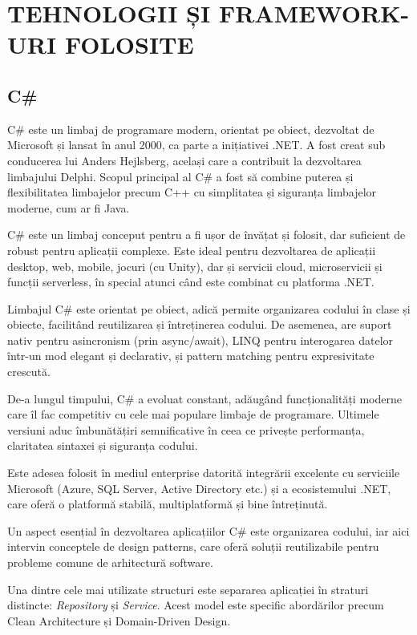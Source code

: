 \chapter{TEHNOLOGII ȘI FRAMEWORK-URI FOLOSITE}
\section{C\#}

C\# este un limbaj de programare modern, orientat pe obiect, dezvoltat de Microsoft și lansat în anul 2000, ca parte a inițiativei .NET. A fost creat sub conducerea lui Anders Hejlsberg, același care a contribuit la dezvoltarea limbajului Delphi. Scopul principal al C\# a fost să combine puterea și flexibilitatea limbajelor precum C++ cu simplitatea și siguranța limbajelor moderne, cum ar fi Java. \parencite{charp}

C\# este un limbaj conceput pentru a fi ușor de învățat și folosit, dar suficient de robust pentru aplicații complexe. Este ideal pentru dezvoltarea de aplicații desktop, web, mobile, jocuri (cu Unity), dar și servicii cloud, microservicii și funcții serverless, în special atunci când este combinat cu platforma .NET. \parencite{charp}

Limbajul C\# este orientat pe obiect, adică permite organizarea codului în clase și obiecte, facilitând reutilizarea și întreținerea codului. De asemenea, are suport nativ pentru asincronism (prin async/await), LINQ pentru interogarea datelor într-un mod elegant și declarativ, și pattern matching pentru expresivitate crescută. \parencite{charp}

De-a lungul timpului, C\# a evoluat constant, adăugând funcționalități moderne care îl fac competitiv cu cele mai populare limbaje de programare. Ultimele versiuni aduc îmbunătățiri semnificative în ceea ce privește performanța, claritatea sintaxei și siguranța codului. \parencite{charp}

Este adesea folosit în mediul enterprise datorită integrării excelente cu serviciile Microsoft (Azure, SQL Server, Active Directory etc.) și a ecosistemului .NET, care oferă o platformă stabilă, multiplatformă și bine întreținută. \parencite{charp}

Un aspect esențial în dezvoltarea aplicațiilor C\# este organizarea codului, iar aici intervin conceptele de design patterns, care oferă soluții reutilizabile pentru probleme comune de arhitectură software. \parencite{charp}

Una dintre cele mai utilizate structuri este separarea aplicației în straturi distincte: \textit{Repository} și \textit{Service}. Acest model este specific abordărilor precum Clean Architecture și Domain-Driven Design. \parencite{designPatterns}


